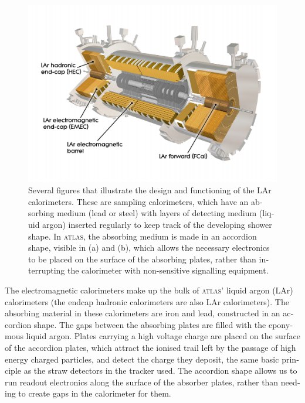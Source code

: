 \begin{english}
\begin{figure}[htp]
\begin{minipage}[b]{.59\textwidth}
    \begin{center}
    \includegraphics[width=1\textwidth]{figures/CaloDiag.png}
    \end{center}
\end{minipage}
\begin{minipage}[b]{.4\textwidth}
\caption{Several figures \cite{atlasweb} that illustrate the design and functioning of the LAr calorimeters. These are sampling calorimeters, which have an absorbing medium (lead or steel) with layers of detecting medium (liquid argon) inserted regularly to keep track of the developing shower shape. In \textsc{atlas}, the absorbing medium is made in an accordion shape, visible in (a) and (b), which allows the necessary electronics to be placed on the surface of the absorbing plates, rather than interrupting the calorimeter with non-sensitive signalling equipment.}
\label{calostruc}
\end{minipage}
\end{figure}

The electromagnetic calorimeters make up the bulk of \textsc{atlas}' liquid argon (LAr) calorimeters (the endcap hadronic calorimeters are also LAr calorimeters). The absorbing material in these calorimeters are iron and lead, constructed in an accordion shape. The gaps between the absorbing plates are filled with the eponymous liquid argon. Plates carrying a high voltage charge are placed on the surface of the accordion plates, which attract the ionised trail left by the passage of high energy charged particles, and detect the charge they deposit, the same basic principle as the straw detectors in the tracker used. The accordion shape allows us to run readout electronics along the surface of the absorber plates, rather than needing to create gaps in the calorimeter for them.


\end{english}

